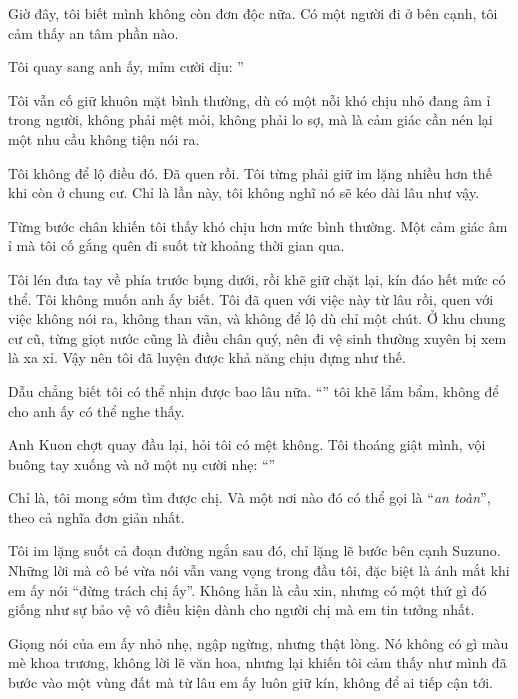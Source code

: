 \documentclass[../main.tex]{subfiles}
\begin{document}
Giờ đây, tôi biết mình không còn đơn độc nữa. Có một người đi ở bên cạnh, tôi cảm thấy an tâm phần nào.

Tôi quay sang anh ấy, mỉm cười dịu: ''

\il

Tôi vẫn cố giữ khuôn mặt bình thường, dù có một nỗi khó chịu nhỏ đang âm ỉ trong người, không phải mệt mỏi, không phải lo sợ, mà là cảm giác cần nén lại một nhu cầu không tiện nói ra.

Tôi không để lộ điều đó. Đã quen rồi. Tôi từng phải giữ im lặng nhiều hơn thế khi còn ở chung cư. Chỉ là lần này, tôi không nghĩ nó sẽ kéo dài lâu như vậy.

Từng bước chân khiến tôi thấy khó chịu hơn mức bình thường. Một cảm giác âm ỉ mà tôi cố gắng quên đi suốt từ khoảng thời gian qua.

Tôi lén đưa tay về phía trước bụng dưới, rồi khẽ giữ chặt lại, kín đáo hết mức có thể. Tôi không muốn anh ấy biết. Tôi đã quen với việc này từ lâu rồi, quen với việc không nói ra, không than vãn, và không để lộ dù chỉ một chút. Ở khu chung cư cũ, từng giọt nước cũng là điều chân quý, nên đi vệ sinh thường xuyên bị xem là xa xỉ. Vậy nên tôi đã luyện được khả năng chịu đựng như thế.

Dẫu chẳng biết tôi có thể nhịn được bao lâu nữa. ``'' tôi khẽ lẩm bẩm, không để cho anh ấy có thể nghe thấy.

Anh Kuon chợt quay đầu lại, hỏi tôi có mệt không. Tôi thoáng giật mình, vội buông tay xuống và nở một nụ cười nhẹ: ``''

Chỉ là, tôi mong sớm tìm được chị. Và một nơi nào đó có thể gọi là ``\emph{an toàn}'', theo cả nghĩa đơn giản nhất.

\il


Tôi im lặng suốt cả đoạn đường ngắn sau đó, chỉ lặng lẽ bước bên cạnh Suzuno. Những lời mà cô bé vừa nói vẫn vang vọng trong đầu tôi, đặc biệt là ánh mắt khi em ấy nói ``đừng trách chị ấy''. Không hẳn là cầu xin, nhưng có một thứ gì đó giống như sự bảo vệ vô điều kiện dành cho người chị mà em tin tưởng nhất.

Giọng nói của em ấy nhỏ nhẹ, ngập ngừng, nhưng thật lòng. Nó không có gì màu mè khoa trương, không lời lẽ văn hoa, nhưng lại khiến tôi cảm thấy như mình đã bước vào một vùng đất mà từ lâu em ấy luôn giữ kín, không để ai tiếp cận tới.
\end{document}
